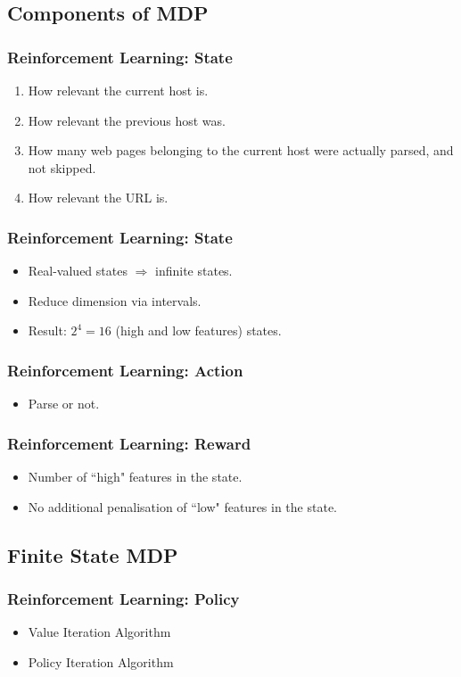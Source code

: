 \documentclass{beamer}
\begin{document}
\subsection{Components of MDP}
\begin{frame}
\frametitle{Reinforcement Learning: State}
\begin{enumerate}
\item How relevant the current host is.
\item How relevant the previous host was.
\item How many web pages belonging to the current host were actually parsed, and not skipped.
\item How relevant the URL is.
\end{enumerate}
\end{frame}

\begin{frame}
\frametitle{Reinforcement Learning: State}
\begin{itemize}
\item Real-valued states $ \Rightarrow $ infinite states.
\item Reduce dimension via intervals.
\item Result: $ 2^4 = 16 $ (high and low features) states.
\end{itemize}
\end{frame}

\begin{frame}
\frametitle{Reinforcement Learning: Action}
\begin{itemize}
\item Parse or not.
\end{itemize}
\end{frame}

\begin{frame}
\frametitle{Reinforcement Learning: Reward}
\begin{itemize}
\item Number of ``high" features in the state.
\item No additional penalisation of ``low" features in the state.
\end{itemize}
\end{frame}

\subsection{Finite State MDP}
\begin{frame}
\frametitle{Reinforcement Learning: Policy}
\begin{itemize}
\item Value Iteration Algorithm
\item Policy Iteration Algorithm
\end{itemize}
\end{frame}
\end{document}
